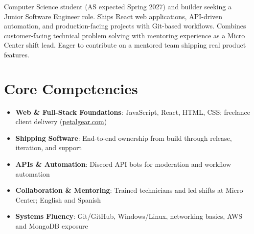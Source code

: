 \documentclass[11pt,a4paper,sans]{moderncv}
\begin{document}
\makecvtitle

\vspace{6pt}
\small{Computer Science student (AS expected Spring 2027) and builder seeking a Junior Software Engineer role. Ships React web applications, API-driven automation, and production-facing projects with Git-based workflows. Combines customer-facing technical problem solving with mentoring experience as a Micro Center shift lead. Eager to contribute on a mentored team shipping real product features.}

\section{Core Competencies}
\vspace{1pt}
\begin{itemize}
\item \textbf{Web \& Full-Stack Foundations}: JavaScript, React, HTML, CSS; freelance client delivery (\href{https://petalgear.com}{petalgear.com})
\item \textbf{Shipping Software}: End-to-end ownership from build through release, iteration, and support
\item \textbf{APIs \& Automation}: Discord API bots for moderation and workflow automation
\item \textbf{Collaboration \& Mentoring}: Trained technicians and led shifts at Micro Center; English and Spanish
\item \textbf{Systems Fluency}: Git/GitHub, Windows/Linux, networking basics, AWS and MongoDB exposure
\end{itemize}
\end{document}
